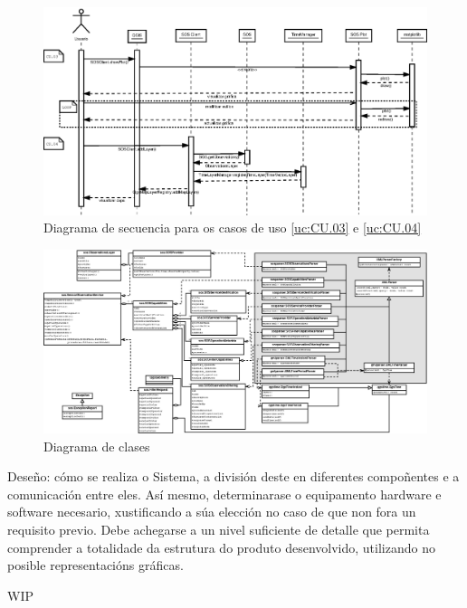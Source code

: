 \begin{figure}
 \centering
 \includegraphics[width=\textwidth]{images/seq2.eps}
 \caption{Diagrama de secuencia para os casos de uso \ref{uc:CU.03} e \ref{uc:CU.04}}
 \label{fig:diaSeq2}
\end{figure}

\begin{figure}
 \centering
 \includegraphics[width=\textwidth]{images/clases_sos.eps}
 \caption{Diagrama de clases}
 \label{fig:diaClassSOS}
\end{figure}


Deseño: cómo se realiza o Sistema, a división deste en diferentes compoñentes e a comunicación entre eles. Así mesmo, determinarase o equipamento hardware e software necesario, xustificando a súa elección no caso de que non fora un requisito previo. Debe achegarse a un nivel suficiente de detalle que permita comprender a totalidade da estrutura do produto desenvolvido, utilizando no  posible representacións gráficas.

WIP
